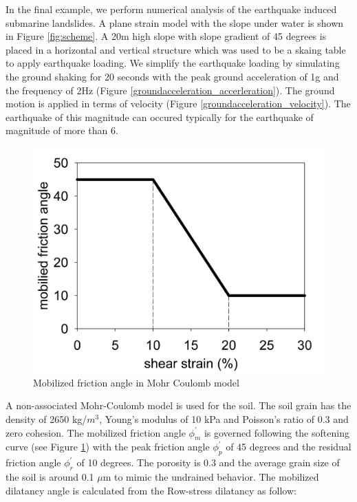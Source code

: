 \documentclass[preprint,12pt]{elsarticle}
\begin{document}
In the final example, we perform numerical analysis of the earthquake induced submarine landslides. A plane strain model with the slope under water is shown in Figure \ref{fig:scheme}. A 20m high slope with slope gradient of 45 degrees is placed in a horizontal and vertical structure which was used to be a skaing table to apply earthquake loading. We simplify the earthquake loading by simulating the ground shaking for 20 seconds with the peak ground acceleration of 1g and the frequency of 2Hz (Figure \ref{groundacceleration_accerleration}). The ground motion is applied in terms of velocity (Figure \ref{groundacceleration_velocity}). The earthquake of this magnitude can occured typically for the earthquake of magnitude of more than 6. \\
%
%
\begin{figure}[H]
\center
\includegraphics[scale=0.25]{model.jpg}
\caption{Mobilized friction angle in Mohr Coulomb model}
\label{fig:model}
\end {figure}
%
%
A non-associated Mohr-Coulomb model is used for the soil. The soil grain has the density of 2650 kg/$m^3$, Young's modulus of 10 kPa and Poisson's ratio of 0.3 and zero cohesion. The mobilized friction angle $\phi^\prime_m$ is governed following the softening curve (see Figure \ref{fig:model}) with the peak friction angle $\phi^\prime_p$ of 45 degrees and the residual friction angle $\phi^\prime_r$ of 10 degrees. The porosity is 0.3 and the average grain size of the soil is around 0.1 $\mu$m to mimic the undrained behavior. The mobilized dilatancy angle is calculated from the Row-stress dilatancy as follow:
\end{document}
